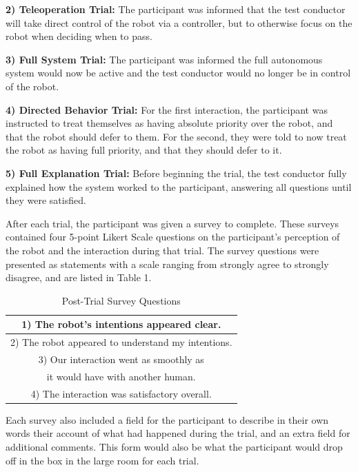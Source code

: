 \documentclass[letterpaper, 10 pt, conference]{ieeeconf}  %
\begin{document}
\textbf{2) Teleoperation Trial:} The participant was informed that the test conductor will take direct control of the robot via a controller, but to otherwise focus on the robot when deciding when to pass. 

\textbf{3) Full System Trial:} The participant was informed the full autonomous system would now be active and the test conductor would no longer be in control of the robot.

\textbf{4) Directed Behavior Trial:} For the first interaction, the participant was instructed to treat themselves as having absolute priority over the robot, and that the robot should defer to them. For the second, they were told to now treat the robot as having full priority, and that they should defer to it.

\textbf{5) Full Explanation Trial:} Before beginning the trial, the test conductor fully explained how the system worked to the participant, answering all questions until they were satisfied.

After each trial, the participant was given a survey to complete. These surveys contained four 5-point Likert Scale questions on the participant’s perception of the robot and the interaction during that trial. The survey questions were presented as statements with a scale ranging from strongly agree to strongly disagree, and are listed in Table 1.

\begin{table}[h]
\caption{Post-Trial Survey Questions}
\label{survey_questions}
\begin{center}
\begin{tabular}{|c|}
\hline
1) The robot’s intentions appeared clear.\\
\hline
2) The robot appeared to understand my intentions.\\
\hline
3) Our interaction went as smoothly as \\
it would have with another human.\\
\hline
4) The interaction was satisfactory overall.\\
\hline
\end{tabular}
\end{center}
\end{table}

Each survey also included a field for the participant to describe in their own words their account of what had happened during the trial, and an extra field for additional comments. This form would also be what the participant would drop off in the box in the large room for each trial.
\end{document}
